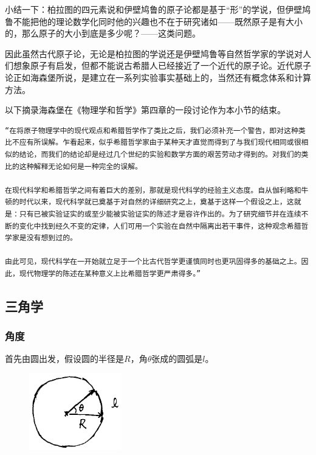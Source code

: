小结一下：柏拉图的四元素说和伊壁鸠鲁的原子论都是基于“形”的学说，但伊壁鸠鲁不能把他的理论数学化同时他的兴趣也不在于研究诸如——既然原子是有大小的，那么原子的大小到底是多少呢？——这类问题。

因此虽然古代原子论，无论是柏拉图的学说还是伊壁鸠鲁等自然哲学家的学说对人们想象原子有启发，但都不能说古希腊人已经接近了一个近代的原子论。近代原子论正如海森堡所说，是建立在一系列实验事实基础上的，当然还有概念体系和计算方法。

以下摘录海森堡在《物理学和哲学》第四章的一段讨论作为本小节的结束。

\begin{verbatim}
“在将原子物理学中的现代观点和希腊哲学作了类比之后，我们必须补充一个警告，即对这种类比不应有所误解。乍看起来，似乎希腊哲学家由于某种天才直觉而得到了与我们现代相同或很相似的结论，而我们的结论却是经过几个世纪的实验和数学方面的艰苦劳动才得到的。对我们的类比的这种解释无论如何是一种完全的误解。

在现代科学和希腊哲学之间有着巨大的差别，那就是现代科学的经验主义态度。自从伽利略和牛顿的时代以来，现代科学就已奠基于对自然的详细研究之上，奠基于这样一个假设之上，这就是：只有已被实验证实的或至少能被实验证实的陈述才是容许作出的。为了研究细节并在连续不断的变化中找到经久不变的定律，人们可用一个实验在自然中隔离出若干事件，这种观念希腊哲学家是没有想到过的。

由此可见，现代科学在一开始就立足于一个比古代哲学更谨慎同时也更巩固得多的基础之上。因此，现代物理学的陈述在某种意义上比希腊哲学更严肃得多。”
\end{verbatim}

\subsection{三角学}

\subsubsection{角度}

首先由圆出发，假设圆的半径是$R$，角$\theta$张成的圆弧是$l$。

\begin{figure}[htbp]
\begin{center}
\includegraphics[width=4cm]{Preface/circle.png}
\end{center}
\end{figure}

